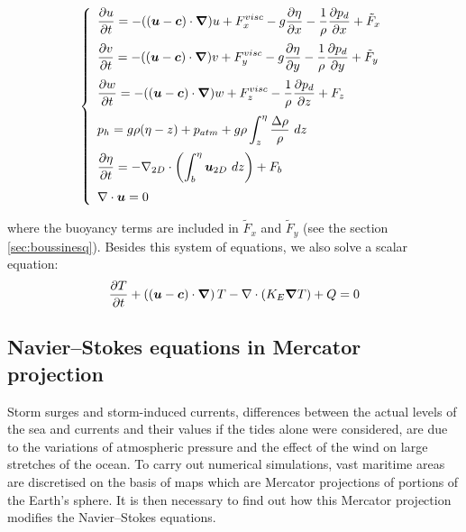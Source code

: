 \begin{equation}
  \left\{\begin{array}{l}
    \displaystyle{\dfrac{\partial u}{\partial t} = - ((\vec{u}-\vec{c})\cdot\Grad)u + F_x^{visc} - g\dfrac{\partial\eta}{\partial x} - \dfrac{1}{\rho}\dfrac{\partial p_d}{\partial x} + \tilde{F}_x}
    \notag \medskip\\
    \displaystyle{\dfrac{\partial v}{\partial t} = - ((\vec{u}-\vec{c})\cdot\Grad)v + F_y^{visc} - g\dfrac{\partial\eta}{\partial y} - \dfrac{1}{\rho}\dfrac{\partial p_d}{\partial y} + \tilde{F}_y}
    \notag \medskip\\
    \displaystyle{\dfrac{\partial w}{\partial t} = - ((\vec{u}-\vec{c})\cdot\Grad)w + F_z^{visc} - \dfrac{1}{\rho}\dfrac{\partial p_d}{\partial z} + F_z}
    \notag \medskip\\
    \displaystyle{p_h = g\rho(\eta-z) + p_{atm} + g\rho\int_z^\eta\dfrac{\Delta\rho}{\rho}~dz}\medskip\\
    \displaystyle{\dfrac{\partial\eta}{\partial t} = - \DivD\left(\int_b^\eta\vec{u}_{2D}~dz\right)+ F_b}
    \notag \medskip\\
    \displaystyle{\Div\vec{u} = 0}
  \end{array}\right.
  \label{eq:NS_FS_expanded}
\end{equation}

where the buoyancy terms are included in $\tilde{F}_x$ and $\tilde{F}_y$ (see the section \ref{sec:boussinesq}). Besides this system of equations, we also solve
a scalar equation:
\begin{equation}
\dfrac{\partial T}{\partial t}+\left((\bm{u}-\bm{c})\cdot\bm{\nabla}\right)T - \nabla \cdot\left(K_{E}\bm{\nabla} T\right)+Q=0
\label{eq:scalarEquation}
\end{equation}

\subsection{Navier--Stokes equations in Mercator projection%
  }

Storm surges and storm-induced currents, differences between the actual levels
of the sea and currents and their values if the tides alone were considered,
are due to the variations of atmospheric pressure and the effect of the wind
on large stretches of the ocean. To carry out numerical simulations, vast
maritime areas are discretised on the basis of maps which are Mercator
projections of portions of the Earth's sphere. It is then necessary to find
out how this Mercator projection modifies the Navier--Stokes equations.

